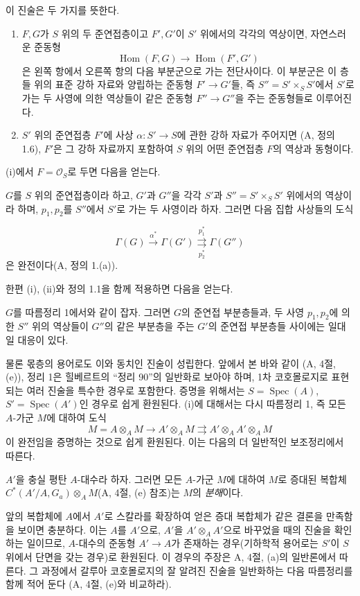 이 진술은 두 가지를 뜻한다.
\begin{enumerate}
\item[(i)] $F,G$가 $S$ 위의 두 준연접층이고 $F',G'$이 $S'$ 위에서의
각각의 역상이면, 자연스러운 준동형
\[
  \operatorname{Hom}(F,G)\longrightarrow\operatorname{Hom}(F',G')
\]
은 왼쪽 항에서 오른쪽 항의 다음 부분군으로 가는 전단사이다. 이 부분군은
이 층들 위의 표준 강하 자료와 양립하는 준동형
$F'\longrightarrow G'$들, 즉 $S''=S'\times_SS'$에서 $S'$로 가는 두
사영에 의한 역상들이 같은 준동형 $F''\longrightarrow G''$을 주는
준동형들로 이루어진다.
\item[(ii)] $S'$ 위의 준연접층 $F'$에 사상
$\alpha:S'\longrightarrow S$에 관한 강하 자료가 주어지면
(A, 정의 1.6), $F'$은 그 강하 자료까지 포함하여 $S$ 위의 어떤
준연접층 $F$의 역상과 동형이다.
\end{enumerate}
(i)에서 $F=\mathcal O_S$로 두면 다음을 얻는다.

 $G$를 $S$ 위의 준연접층이라 하고, $G'$과 $G''$을
각각 $S'$과 $S''=S'\times_SS'$ 위에서의 역상이라 하며, $p_1,p_2$를
$S''$에서 $S'$로 가는 두 사영이라 하자. 그러면 다음 집합 사상들의
도식

\[
  \Gamma(G)\xrightarrow{\alpha^*}\Gamma(G')
  \underset{p_2^*}{\overset{p_1^*}{\rightrightarrows}}\Gamma(G'')
\]
은 완전이다(A, 정의 1.(a)).

한편 (i), (ii)와 정의 1.1을 함께 적용하면 다음을 얻는다.

 $G$를 따름정리 1에서와 같이 잡자. 그러면 $G$의
준연접 부분층들과, 두 사영 $p_1,p_2$에 의한 $S''$ 위의 역상들이
$G''$의 같은 부분층을 주는 $G'$의 준연접 부분층들 사이에는
일대일 대응이 있다.

물론 몫층의 용어로도 이와 동치인 진술이 성립한다. 앞에서 본 바와 같이
(A, 4절, (e)), 정리 1은 힐베르트의 “정리 90”의 일반화로 보아야 하며,
1차 코호몰로지로 표현되는 여러 진술을 특수한 경우로 포함한다. 증명을
위해서는 $S=\operatorname{Spec}(A)$,
$S'=\operatorname{Spec}(A')$인 경우로 쉽게 환원된다. (i)에 대해서는
다시 따름정리 1, 즉 모든 $A$-가군 $M$에 대하여 도식
\[
  M=A\otimes_A M\longrightarrow A'\otimes_A M
  \rightrightarrows A'\otimes_AA'\otimes_A M
\]
이 완전임을 증명하는 것으로 쉽게 환원된다. 이는 다음의 더 일반적인
보조정리에서 따른다.

 $A'$을 충실 평탄 $A$-대수라 하자. 그러면 모든
$A$-가군 $M$에 대하여 $M$로 증대된 복합체
$C^*(A'/A,G_a)\otimes_A M$(A, 4절, (e) 참조)는 $M$의
\emph{분해}이다.

앞의 복합체에 $A$에서 $A'$로 스칼라를 확장하여 얻은 증대 복합체가
같은 결론을 만족함을 보이면 충분하다. 이는 $A$를 $A'$으로, $A'$을
$A'\otimes_AA'$으로 바꾸었을 때의 진술을 확인하는 일이므로,
$A$-대수의 준동형 $A'\longrightarrow A$가 존재하는 경우(기하학적
용어로는 $S'$이 $S$ 위에서 단면을 갖는 경우)로 환원된다. 이 경우의
주장은 A, 4절, (a)의 일반론에서 따른다. 그 과정에서 갈루아
코호몰로지의 잘 알려진 진술을 일반화하는 다음 따름정리를 함께 적어 둔다
(A, 4절, (e)와 비교하라).

